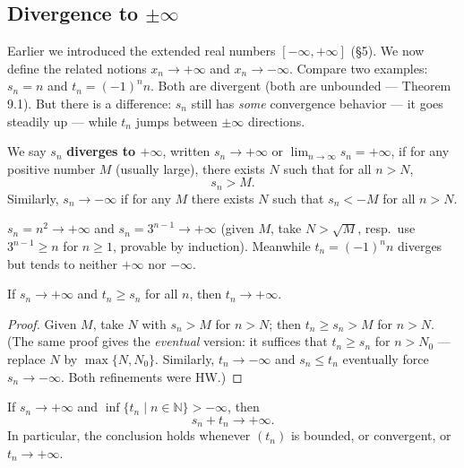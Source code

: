\documentclass[11pt]{report}
\begin{document}
\subsection{Divergence to $\pm\infty$}

Earlier we introduced the extended real numbers $[-\infty, +\infty]$ (\S 5). We now define the related notions $x_n \to +\infty$ and $x_n \to -\infty$. Compare two examples: $s_n = n$ and $t_n = (-1)^n n$. Both are divergent (both are unbounded --- Theorem 9.1). But there is a difference: $s_n$ still has \emph{some} convergence behavior --- it goes steadily up --- while $t_n$ jumps between $\pm\infty$ directions.

\begin{defbox}
We say $s_n$ \textbf{diverges to $+\infty$}, written $s_n \to +\infty$ or $\lim_{n\to\infty} s_n = +\infty$, if for any positive number $M$ (usually large), there exists $N$ such that for all $n > N$,
\[
s_n > M.
\]
Similarly, $s_n \to -\infty$ if for any $M$ there exists $N$ such that $s_n < -M$ for all $n > N$.
\end{defbox}

\begin{exbox}
$s_n = n^2 \to +\infty$ and $s_n = 3^{n-1} \to +\infty$ (given $M$, take $N > \sqrt{M}$, resp.\ use $3^{n-1} \geq n$ for $n \geq 1$, provable by induction). Meanwhile $t_n = (-1)^n n$ diverges but tends to neither $+\infty$ nor $-\infty$.
\end{exbox}

\begin{lembox}
If $s_n \to +\infty$ and $t_n \geq s_n$ for all $n$, then $t_n \to +\infty$.
\end{lembox}

\begin{proof}
Given $M$, take $N$ with $s_n > M$ for $n > N$; then $t_n \geq s_n > M$ for $n > N$. (The same proof gives the \emph{eventual} version: it suffices that $t_n \geq s_n$ for $n > N_0$ --- replace $N$ by $\max\{N, N_0\}$. Similarly, $t_n \to -\infty$ and $s_n \leq t_n$ eventually force $s_n \to -\infty$. Both refinements were HW.)
\end{proof}

\begin{propbox}
If $s_n \to +\infty$ and $\inf\{t_n \mid n \in \mathbb{N}\} > -\infty$, then
\[
s_n + t_n \to +\infty.
\]
In particular, the conclusion holds whenever $(t_n)$ is bounded, or convergent, or $t_n \to +\infty$.
\end{propbox}
\end{document}
